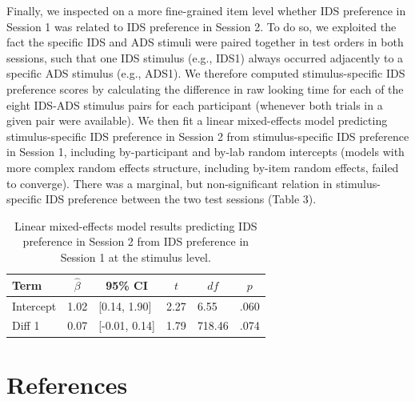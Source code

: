 \documentclass[
  man, donotrepeattitle,floatsintext]{apa6}
\begin{document}
Finally, we inspected on a more fine-grained item level whether IDS preference in Session 1 was related to IDS preference in Session 2.
To do so, we exploited the fact the specific IDS and ADS stimuli were paired together in test orders in both sessions, such that one IDS stimulus (e.g., IDS1) always occurred adjacently to a specific ADS stimulus (e.g., ADS1).
We therefore computed stimulus-specific IDS preference scores by calculating the difference in raw looking time for each of the eight IDS-ADS stimulus pairs for each participant (whenever both trials in a given pair were available).
We then fit a linear mixed-effects model predicting stimulus-specific IDS preference in Session 2 from stimulus-specific IDS preference in Session 1, including by-participant and by-lab random intercepts (models with more complex random effects structure, including by-item random effects, failed to converge).
There was a marginal, but non-significant relation in stimulus-specific IDS preference between the two test sessions (Table 3).

\begin{table}[tbp]

\begin{center}
\begin{threeparttable}

\caption{\label{tab:unnamed-chunk-20}Linear mixed-effects model results predicting IDS preference in Session 2 from IDS preference in Session 1 at the stimulus level.}

\begin{tabular}{llllll}
\toprule
Term & \multicolumn{1}{c}{$\hat{\beta}$} & \multicolumn{1}{c}{95\% CI} & \multicolumn{1}{c}{$t$} & \multicolumn{1}{c}{$\mathit{df}$} & \multicolumn{1}{c}{$p$}\\
\midrule
Intercept & 1.02 & {}[0.14, 1.90] & 2.27 & 6.55 & .060\\
Diff 1 & 0.07 & {}[-0.01, 0.14] & 1.79 & 718.46 & .074\\
\bottomrule
\end{tabular}

\end{threeparttable}
\end{center}

\end{table}

\newpage

\hypertarget{references}{%
\section{References}\label{references}}
\end{document}
